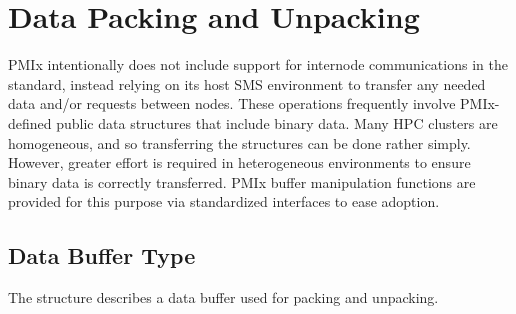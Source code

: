 \chapter{Data Packing and Unpacking}
\label{chap:api_data_mgmt}

\ac{PMIx} intentionally does not include support for internode communications in the standard, instead relying on its host \ac{SMS} environment to transfer any needed data and/or requests between nodes. These operations frequently involve PMIx-defined public data structures that include binary data. Many \ac{HPC} clusters are homogeneous, and so transferring the structures can be done rather simply. However, greater effort is required in heterogeneous environments to ensure binary data is correctly transferred. \ac{PMIx} buffer manipulation functions are provided for this purpose via standardized interfaces to ease adoption.

\section{Data Buffer Type}

The  structure describes a data buffer used for packing and unpacking.

